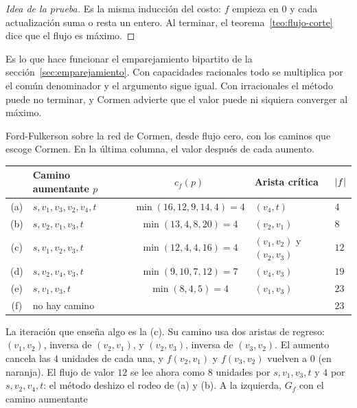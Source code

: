 \documentclass[11pt,letterpaper]{article}
\begin{document}
\begin{proof}[Idea de la prueba]
  Es la misma inducción del costo: $f$ empieza en $0$ y cada
  actualización suma o resta un entero. Al terminar, el
  teorema~\ref{teo:flujo-corte} dice que el flujo es máximo.
\end{proof}

Es lo que hace funcionar el emparejamiento bipartito de la
sección~\ref{sec:emparejamiento}. Con capacidades racionales todo se
multiplica por el común denominador y el argumento sigue igual. Con
irracionales el método puede no terminar, y Cormen advierte que el
valor puede ni siquiera converger al máximo.

\begin{ejemplo}\label{ej:flujo-ff266}
  Ford-Fulkerson sobre la red de Cormen, desde flujo cero, con los
  caminos que escoge Cormen. En la última columna, el valor después de
  cada aumento.
  \begin{center}
  \small
  \begin{tabular}{clcll}
    \toprule
    & \textbf{Camino aumentante $p$} & $c_f(p)$
      & \textbf{Arista crítica} & $\left\lvert f \right\rvert$ \\
    \midrule
    (a) & $s, v_1, v_3, v_2, v_4, t$ & $\min(16, 12, 9, 14, 4) = 4$
        & $(v_4, t)$ & $4$ \\
    (b) & $s, v_2, v_1, v_3, t$ & $\min(13, 4, 8, 20) = 4$
        & $(v_2, v_1)$ & $8$ \\
    (c) & $s, v_1, v_2, v_3, t$ & $\min(12, 4, 4, 16) = 4$
        & $(v_1, v_2)$ y $(v_2, v_3)$ & $12$ \\
    (d) & $s, v_2, v_4, v_3, t$ & $\min(9, 10, 7, 12) = 7$
        & $(v_4, v_3)$ & $19$ \\
    (e) & $s, v_1, v_3, t$ & $\min(8, 4, 5) = 4$
        & $(v_1, v_3)$ & $23$ \\
    (f) & no hay camino & & & $23$ \\
    \bottomrule
  \end{tabular}
  \end{center}
  La iteración que enseña algo es la (c). Su camino usa dos aristas de
  regreso: $(v_1, v_2)$, inversa de $(v_2, v_1)$, y $(v_2, v_3)$,
  inversa de $(v_3, v_2)$. El aumento cancela las $4$ unidades de cada
  una, y $f(v_2, v_1)$ y $f(v_3, v_2)$ vuelven a $0$ (en naranja). El
  flujo de valor $12$ se lee ahora como $8$ unidades por
  $s, v_1, v_3, t$ y $4$ por $s, v_2, v_4, t$: el método deshizo el
  rodeo de (a) y (b). A la izquierda, $G_f$ con el camino aumentante

\end{ejemplo}
\end{document}

